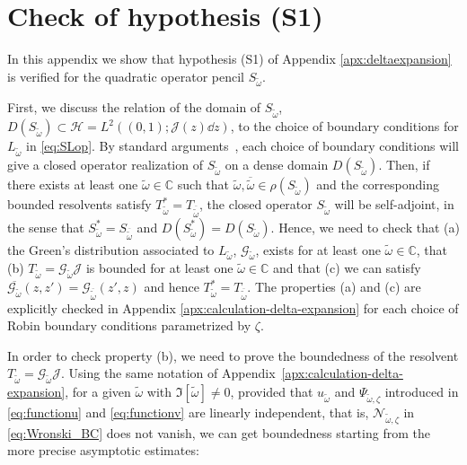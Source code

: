 \documentclass[aps, prd, amsmath, floats, floatfix, twocolumn, nofootinbib, superscriptaddress, showpacs]{revtex4-1}
\def\bC{{\mathbb C}}
\def\cG{\mathcal{G}}
\def\cJ{\mathcal{J}}
\def\tomega{{\tilde{\omega}}}
\begin{document}
\section{Check of hypothesis (S1)}
\label{apx:S1}

In this appendix we show that hypothesis (S1) of Appendix \ref{apx:deltaexpansion} is verified for the quadratic operator pencil $S_{\tilde{\omega}}$.

First, we discuss the relation of the domain of $S_{\tilde{\omega}}$, 
$D(S_{\tilde{\omega}})\subset\mathcal{H} = L^2((0,1); \cJ(z)\dd{z})$, to the choice of
boundary conditions for $L_\tomega$ in \eqref{eq:SLop}. By standard
arguments~\cite[Ch.3]{weidmann}, each choice of boundary conditions will
give a closed operator realization of $S_\tomega$ on a dense domain
$D(S_\tomega)$. Then, if there exists at least one $\tomega \in \bC$ such that
$\tomega,\overline{\tomega} \in \rho(S_\tomega)$ and the corresponding bounded
resolvents satisfy $T_\tomega^* = T_{\overline{\tomega}}$, the closed
operator $S_\tomega$ will be self-adjoint, in the sense that $S^*_\tomega =
S_{\overline{\tomega}}$ and $D(S_\tomega^*) = D(S_\tomega)$.
Hence, we need to check that (a) the Green's distribution associated to $L_\tomega$, $\cG_\tomega$, exists for at
least one $\tomega \in \bC$, that (b) $T_\tomega = \cG_\tomega \cJ$ is
bounded for at least one $\tomega \in \bC$ and that (c) we can satisfy
$\overline{\cG_\tomega}(z,z') = \cG_{\overline{\tomega}}(z',z)$ and
hence $T^*_{\tomega} = T_{\overline{\tomega}}$. The properties (a)
and (c) are explicitly checked in Appendix \ref{apx:calculation-delta-expansion} for each choice of Robin boundary
conditions parametrized by $\zeta$. 

In order to check property (b), 
we need to prove the boundedness of the resolvent $T_\tomega=\mathcal{G}_\tomega\mathcal{J}$. Using the same notation of Appendix~\ref{apx:calculation-delta-expansion}, for a given $\tomega$ with $\Im[\tomega] \ne 0$, provided that $u_\tomega$ and
$\Psi_{\tomega,\zeta}$ introduced in \eqref{eq:functionu} and \eqref{eq:functionv} are linearly independent, that is,
$\mathcal{N}_{\tomega,\zeta}$ in \eqref{eq:Wronski_BC} does not vanish, we can get boundedness starting from the more precise asymptotic estimates:
\end{document}
